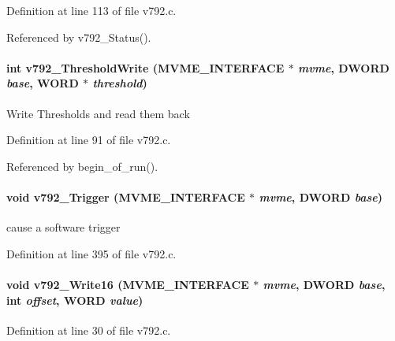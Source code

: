 Definition at line 113 of file v792.c.

Referenced by v792\_\-Status().
\paragraph[{v792\_\-ThresholdWrite}]{\setlength{\rightskip}{0pt plus 5cm}int v792\_\-ThresholdWrite ({\bf MVME\_\-INTERFACE} $\ast$ {\em mvme}, \/  {\bf DWORD} {\em base}, \/  {\bf WORD} $\ast$ {\em threshold})}\hfill\label{v792_8h_a3eec625d3dca654c6f99f82d964d4287}
Write Thresholds and read them back 

Definition at line 91 of file v792.c.

Referenced by begin\_\-of\_\-run().
\paragraph[{v792\_\-Trigger}]{\setlength{\rightskip}{0pt plus 5cm}void v792\_\-Trigger ({\bf MVME\_\-INTERFACE} $\ast$ {\em mvme}, \/  {\bf DWORD} {\em base})}\hfill\label{v792_8h_a14c74a32db3fd4dacdeadfdfdefaff26}
cause a software trigger 

Definition at line 395 of file v792.c.
\paragraph[{v792\_\-Write16}]{\setlength{\rightskip}{0pt plus 5cm}void v792\_\-Write16 ({\bf MVME\_\-INTERFACE} $\ast$ {\em mvme}, \/  {\bf DWORD} {\em base}, \/  int {\em offset}, \/  {\bf WORD} {\em value})}\hfill\label{v792_8h_ab06f0b9d499f3b99ad9d9ad1cb879b29}


Definition at line 30 of file v792.c.